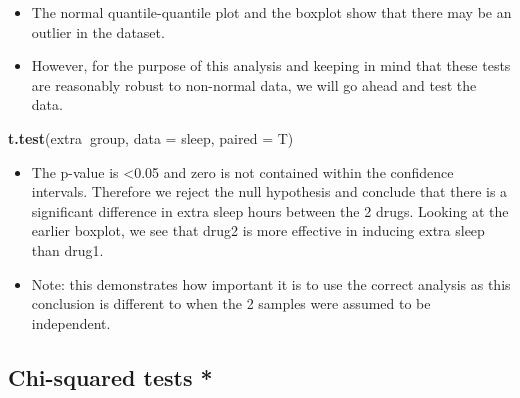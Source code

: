 \documentclass[]{article}
\newenvironment{Shaded}{\begin{snugshade}}{\end{snugshade}}
\newcommand{\DataTypeTok}[1]{\textcolor[rgb]{0.13,0.29,0.53}{#1}}
\newcommand{\DecValTok}[1]{\textcolor[rgb]{0.00,0.00,0.81}{#1}}
\newcommand{\KeywordTok}[1]{\textcolor[rgb]{0.13,0.29,0.53}{\textbf{#1}}}
\newcommand{\NormalTok}[1]{#1}
\newcommand{\OperatorTok}[1]{\textcolor[rgb]{0.81,0.36,0.00}{\textbf{#1}}}
\newcommand{\StringTok}[1]{\textcolor[rgb]{0.31,0.60,0.02}{#1}}
\begin{document}
\begin{Shaded}
\end{Shaded}

\begin{itemize}
\item
  The normal quantile-quantile plot and the boxplot show that there may be an outlier in the dataset.
\item
  However, for the purpose of this analysis and keeping in mind that these tests are reasonably robust to non-normal data, we will go ahead and test the data.
\end{itemize}

\begin{Shaded}
\begin{Highlighting}[]
\KeywordTok{t.test}\NormalTok{(extra}\OperatorTok{~}\NormalTok{group, }\DataTypeTok{data =}\NormalTok{ sleep, }\DataTypeTok{paired =}\NormalTok{ T)}
\end{Highlighting}
\end{Shaded}

\begin{itemize}
\item
  The p-value is \textless{}0.05 and zero is not contained within the confidence intervals. Therefore we reject the null hypothesis and conclude that there is a significant difference in extra sleep hours between the 2 drugs. Looking at the earlier boxplot, we see that drug2 is more effective in inducing extra sleep than drug1.
\item
  Note: this demonstrates how important it is to use the correct analysis as this conclusion is different to when the 2 samples were assumed to be independent.
\end{itemize}

\hypertarget{chi-squared-tests}{%
\subsection{Chi-squared tests *}\label{chi-squared-tests}}
\end{document}
